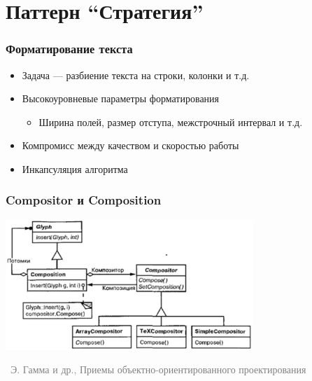 \documentclass[xetex,mathserif,serif]{beamer}
\newcommand{\attribution}[1] {
	\vspace{-5mm}\begin{flushright}\begin{scriptsize}\textcolor{gray}{\textcopyright\, #1}\end{scriptsize}\end{flushright}
}
\begin{document}
	\section{Паттерн ``Стратегия''}

	\begin{frame}
		\frametitle{Форматирование текста}
		\begin{itemize}
			\item Задача --- разбиение текста на строки, колонки и т.д.
			\item Высокоуровневые параметры форматирования
			\begin{itemize}
				\item Ширина полей, размер отступа, межстрочный интервал и т.д.
			\end{itemize}
			\item Компромисс между качеством и скоростью работы
			\item Инкапсуляция алгоритма
		\end{itemize}
	\end{frame}

	\begin{frame}
		\frametitle{Compositor и Composition}
		\begin{center}
			\includegraphics[width=0.7\textwidth]{compositor.png}
			\attribution{Э. Гамма и др., Приемы объектно-ориентированного проектирования}
		\end{center}
	\end{frame}
\end{document}
